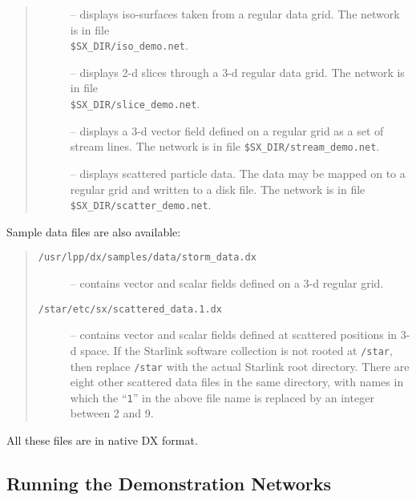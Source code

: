 \begin{quote}
\begin{description}

\item [] -- displays iso-surfaces taken from a regular data grid.
The network is in file \\
{\tt \$SX\_DIR/iso\_demo.net}.

\item [] -- displays 2-d slices through a 3-d
regular data grid. The network is in file \\
{\tt \$SX\_DIR/slice\_demo.net}.

\item [] -- displays a 3-d vector field defined on a
regular grid as a set of stream lines. The network is in file
{\tt \$SX\_DIR/stream\_demo.net}.

\item [] -- displays scattered particle data. The data may be
mapped on to a regular grid and written to a disk file.
The network is in file {\tt \$SX\_DIR/scatter\_demo.net}.

\end{description}
\end{quote}

Sample data files are also available:

\begin{quote}
\begin{description}

\item[{\tt /usr/lpp/dx/samples/data/storm\_data.dx}] -- contains vector and
scalar fields defined on a 3-d regular grid.

\item[{\tt /star/etc/sx/scattered\_data.1.dx}] -- contains vector and scalar
fields defined at scattered positions in 3-d space. If the
Starlink software collection is not rooted at {\tt /star}, then replace
{\tt /star} with the actual Starlink root directory. There are eight
other scattered data files in the same directory, with names in which the
``{\tt 1}'' in the above file name is replaced by an integer between 2
and 9.

\end{description}
\end{quote}

All these files are in native DX format.

\subsection{Running the Demonstration Networks}
\label{SEC:RUNNING_DEMO}

